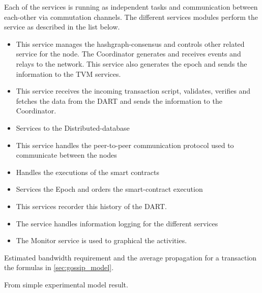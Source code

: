 Each of the services is running as independent tasks and communication between each-other via commutation channels. The different services modules perform the service as described in the list below.

\begin{itemize}
	\item[\bfit{Coordinator}] This service manages the hashgraph-consensus and controls other related service for the node. 
	The Coordinator generates and receives events and relays to the network. This service also generates the epoch and sends the information to the TVM services.
	\item[\bfit{Transaction}] This service receives the incoming transaction script, validates, verifies and fetches the data from the DART and sends the information to the Coordinator.
	\item[\bfit{DART}] Services to the Distributed-database
	\item[\bfit{P2P}] This service handles the peer-to-peer communication protocol used to communicate between the nodes
	\item[\bfit{TVM}] Handles the executions of the smart contracts
	\item[\bfit{Transcript}] Services the Epoch and orders the smart-contract execution
	\item[\bfit{Recorder}] This services recorder this history of the DART.
	\item[\bfit{Logger}] The service handles information logging for the different services
	\item[\bfit{Monitor}] The Monitor service is used to graphical the activities.
\end{itemize}


Estimated bandwidth requirement and the average propagation for a transaction the formulas in \cref{sec:gossip_model}.
 
From simple experimental model result.

